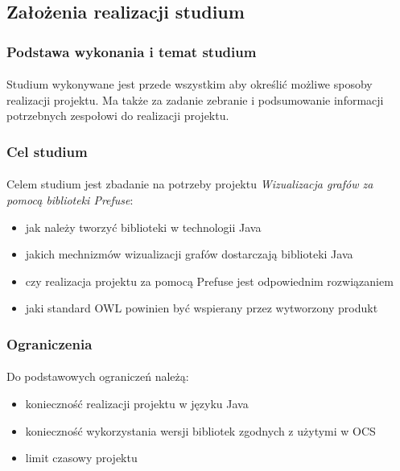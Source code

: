 \subsection{Założenia realizacji studium}

\subsubsection{Podstawa wykonania i temat studium}
\paragraph{} Studium wykonywane jest przede wszystkim aby określić możliwe sposoby realizacji projektu. Ma także za zadanie zebranie i podsumowanie informacji potrzebnych zespołowi do realizacji projektu.

\subsubsection{Cel studium}
\paragraph{} Celem studium jest zbadanie na potrzeby projektu \textit{Wizualizacja grafów za pomocą biblioteki Prefuse}:
\begin{itemize}
 	\item jak należy tworzyć biblioteki w technologii Java
 	\item jakich mechnizmów wizualizacji grafów dostarczają biblioteki Java
	\item czy realizacja projektu za pomocą Prefuse jest odpowiednim rozwiązaniem
	\item jaki standard OWL powinien być wspierany przez wytworzony produkt
\end{itemize}

\subsubsection{Ograniczenia}
\paragraph{} Do podstawowych ograniczeń należą:
\begin{itemize}
 	\item konieczność realizacji projektu w języku Java
	\item konieczność wykorzystania wersji bibliotek zgodnych z użytymi w OCS
	\item limit czasowy projektu
\end{itemize}



